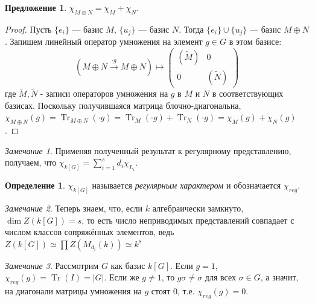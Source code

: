 \documentclass{article}
\newtheorem*{proposition}{Предложение}
\theoremstyle{definition}
\newtheorem*{definition}{Определение}
\theoremstyle{remark}
\newtheorem*{remark}{Замечание}
\DeclareMathOperator{\Tr}{Tr}
\begin{document}
\begin{proposition}
    $\chi_{M \oplus N} = \chi_M + \chi_N$.
\end{proposition}
\begin{proof}
    Пусть $\{e_i\}$ --- базис $M$, $\{u_j\}$ --- базис $N$. Тогда $\{e_i\} \cup \{u_j\}$ --- базис $M \oplus N$. Запишем линейный оператор умножения на элемент $g \in G$ в этом базисе:
    \begin{equation*}
        (M \oplus N \overset{\cdot g}{\longrightarrow} M \oplus N) \mapsto \begin{pmatrix}
            (\tilde{M}) & 0 \\
            0 & (\tilde{N})
        \end{pmatrix}
    \end{equation*}
    где $\tilde{M}, \tilde{N}$ - записи операторов умножения на $g$ в $M$ и $N$ в соответствующих базисах. Поскольку получившаяся матрица блочно-диагональна, $\chi_{M \oplus N}(g) = \Tr_{M \oplus N}(\cdot g) = \Tr_M(\cdot g) + \Tr_N(\cdot g) = \chi_M(g) + \chi_N(g)$.
\end{proof}

\begin{remark}
    Применяя полученный результат к регулярному представлению, получаем, что $\chi_{k[G]} = \sum_{i = 1}^{s} d_i \chi_{L_i}$.
\end{remark}

\begin{definition}
    $\chi_{k[G]}$ называется \textit{регулярным характером} и обозначается $\chi_{reg}$.
\end{definition}

\begin{remark}
    Теперь знаем, что, если $k$ алгебраически замкнуто, $\dim Z(k[G]) = s$, то есть число неприводимых представлений совпадает с числом классов сопряжённых элементов, ведь $Z(k[G]) \simeq \prod Z(M_{d_i}(k)) \simeq k^s$
\end{remark}

\begin{remark}
    Рассмотрим $G$ как базис $k[G]$. Если $g = 1$, $\chi_{reg}(g) = \Tr(I) = |G|$. Если же $g \neq 1$, то $g \sigma \neq \sigma$ для всех $\sigma \in G$, а значит, на диагонали матрицы умножения на $g$ стоят 0, т.е. $\chi_{reg}(g) = 0$.
\end{remark}
\end{document}
